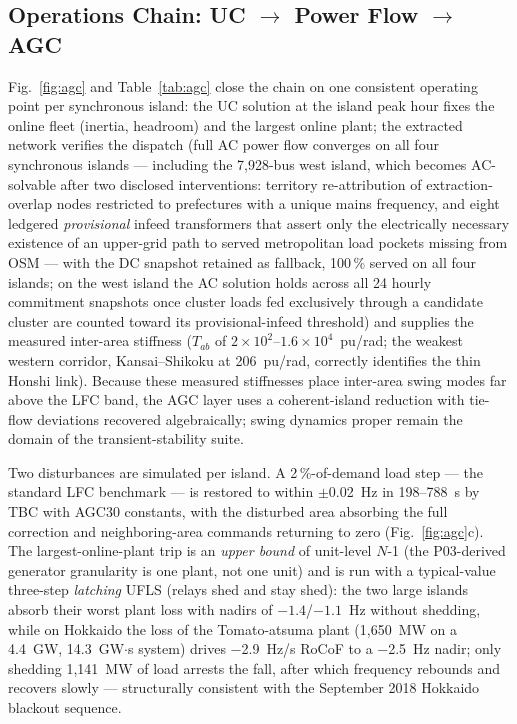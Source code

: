 \documentclass[journal]{IEEEtran}
\begin{document}
\subsection{Operations Chain: UC $\to$ Power Flow $\to$ AGC}
Fig.~\ref{fig:agc} and Table~\ref{tab:agc} close the chain on one consistent operating point per synchronous island: the UC solution at the island peak hour fixes the online fleet (inertia, headroom) and the largest online plant; the extracted network verifies the dispatch (full AC power flow converges on all four synchronous islands --- including the 7,928-bus west island, which becomes AC-solvable after two disclosed interventions: territory re-attribution of extraction-overlap nodes restricted to prefectures with a unique mains frequency, and eight ledgered \emph{provisional} infeed transformers that assert only the electrically necessary existence of an upper-grid path to served metropolitan load pockets missing from OSM --- with the DC snapshot retained as fallback, 100\,\% served on all four islands; on the west island the AC solution holds across all 24 hourly commitment snapshots once cluster loads fed exclusively through a candidate cluster are counted toward its provisional-infeed threshold) and supplies the measured inter-area stiffness ($T_{ab}$ of $2\times10^2$--$1.6\times10^4$~pu/rad; the weakest western corridor, Kansai--Shikoku at 206~pu/rad, correctly identifies the thin Honshi link). Because these measured stiffnesses place inter-area swing modes far above the LFC band, the AGC layer uses a coherent-island reduction with tie-flow deviations recovered algebraically; swing dynamics proper remain the domain of the transient-stability suite.

Two disturbances are simulated per island. A 2\,\%-of-demand load step --- the standard LFC benchmark --- is restored to within $\pm$0.02~Hz in 198--788~s by TBC with AGC30 constants, with the disturbed area absorbing the full correction and neighboring-area commands returning to zero (Fig.~\ref{fig:agc}c). The largest-online-plant trip is an \emph{upper bound} of unit-level $N$-1 (the P03-derived generator granularity is one plant, not one unit) and is run with a typical-value three-step \emph{latching} UFLS (relays shed and stay shed): the two large islands absorb their worst plant loss with nadirs of $-1.4$/$-1.1$~Hz without shedding, while on Hokkaido the loss of the To\-ma\-to-atsuma plant (1,650~MW on a 4.4~GW, 14.3~GW$\cdot$s system) drives $-$2.9~Hz/s RoCoF to a $-$2.5~Hz nadir; only shedding 1,141~MW of load arrests the fall, after which frequency rebounds and recovers slowly --- structurally consistent with the September 2018 Hokkaido blackout sequence.
\end{document}
